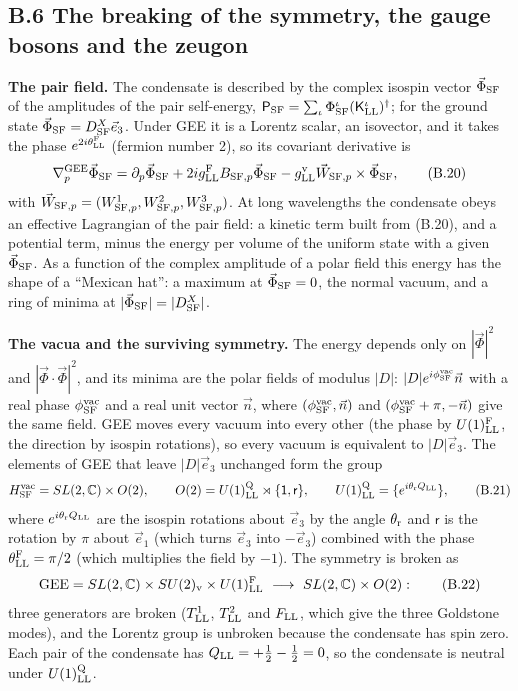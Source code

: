 \documentclass[
  10pt,
]{article}
\begin{document}
\hypertarget{b.6-the-breaking-of-the-symmetry-the-gauge-bosons-and-the-zeugon}{%
\subsection{B.6 The breaking of the symmetry, the gauge bosons and the
zeugon}\label{b.6-the-breaking-of-the-symmetry-the-gauge-bosons-and-the-zeugon}}

\textbf{The pair field.} The condensate is described by the complex
isospin vector \(\vec\Phi_{\rm SF}\) of the amplitudes of the pair
self-energy,
\(\mathsf P_{\rm SF}=\sum_\iota\Phi^\iota_{\rm SF}(\mathsf K^\iota_{\rm LL})^\dagger\);
for the ground state \(\vec\Phi_{\rm SF}=D^X_{\rm SF}\vec e_3\). Under
GEE it is a Lorentz scalar, an isovector, and it takes the phase
\(e^{2i\theta^{\rm F}_{\rm LL}}\) (fermion number 2), so its covariant
derivative is
\[\nabla^{\rm GEE}_p\vec\Phi_{\rm SF}=\partial_p\vec\Phi_{\rm SF}+2ig^{\rm F}_{\rm LL}B_{{\rm SF},p}\vec\Phi_{\rm SF}-g^{\rm v}_{\rm LL}\vec W_{{\rm SF},p}\times\vec\Phi_{\rm SF},\tag{B.20}\]
with
\(\vec W_{{\rm SF},p}=(W^1_{{\rm SF},p},W^2_{{\rm SF},p},W^3_{{\rm SF},p})\).
At long wavelengths the condensate obeys an effective Lagrangian of the
pair field: a kinetic term built from (B.20), and a potential term,
minus the energy per volume of the uniform state with a given
\(\vec\Phi_{\rm SF}\). As a function of the complex amplitude of a polar
field this energy has the shape of a ``Mexican hat'': a maximum at
\(\vec\Phi_{\rm SF}=0\), the normal vacuum, and a ring of minima at
\(|\vec\Phi_{\rm SF}|=|D^X_{\rm SF}|\).

\textbf{The vacua and the surviving symmetry.} The energy depends only
on \(|\vec\Phi|^2\) and \(|\vec\Phi\cdot\vec\Phi|^2\), and its minima
are the polar fields of modulus \(|D|\):
\(|D|e^{i\phi^{\rm vac}_{\rm SF}}\vec n\) with a real phase
\(\phi^{\rm vac}_{\rm SF}\) and a real unit vector \(\vec n\), where
\((\phi^{\rm vac}_{\rm SF},\vec n)\) and
\((\phi^{\rm vac}_{\rm SF}+\pi,-\vec n)\) give the same field. GEE moves
every vacuum into every other (the phase by \(U(1)^{\rm F}_{\rm LL}\),
the direction by isospin rotations), so every vacuum is equivalent to
\(|D|\vec e_3\). The elements of GEE that leave \(|D|\vec e_3\)
unchanged form the group
\[H^{\rm vac}_{\rm SF}=SL(2,\mathbb C)\times O(2),\qquad O(2)=U(1)^{\rm Q}_{\rm LL}\rtimes\{\mathsf 1,\mathsf r\},\qquad U(1)^{\rm Q}_{\rm LL}=\{e^{i\theta_{\rm r}Q_{\rm LL}}\},\tag{B.21}\]
where \(e^{i\theta_{\rm r}Q_{\rm LL}}\) are the isospin rotations about
\(\vec e_3\) by the angle \(\theta_{\rm r}\) and \(\mathsf r\) is the
rotation by \(\pi\) about \(\vec e_1\) (which turns \(\vec e_3\) into
\(-\vec e_3\)) combined with the phase \(\theta^{\rm F}_{\rm LL}=\pi/2\)
(which multiplies the field by \(-1\)). The symmetry is broken as
\[\mathrm{GEE}=SL(2,\mathbb C)\times SU(2)_{\rm v}\times U(1)^{\rm F}_{\rm LL}\ \longrightarrow\ SL(2,\mathbb C)\times O(2):\tag{B.22}\]
three generators are broken (\(T^1_{\rm LL}\), \(T^2_{\rm LL}\) and
\(F_{\rm LL}\), which give the three Goldstone modes), and the Lorentz
group is unbroken because the condensate has spin zero. Each pair of the
condensate has \(Q_{\rm LL}=+\tfrac12-\tfrac12=0\), so the condensate is
neutral under \(U(1)^{\rm Q}_{\rm LL}\).
\end{document}
